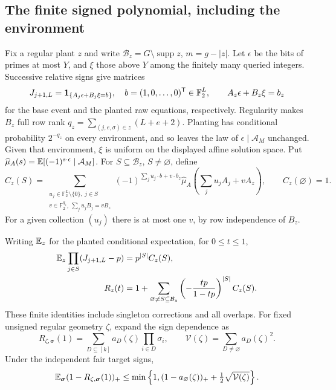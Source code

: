 \subsection{The finite signed polynomial, including the environment}\label{supp:palm:subsec:signed-void}
Fix a regular plant $z$ and write $\mathcal B_z=G\setminus\operatorname{supp}z$, $m=g-|z|$.
Let $\epsilon$ be the bits of primes at most $Y$, and $\xi$ those above $Y$ among the finitely many queried integers. Successive relative signs give matrices
\[
 J_{j+1,L}=\mathbf 1_{\{A_j\epsilon+B_j\xi=b\}},\quad
 b=(1,0,\ldots,0)^{\mathsf T}\in\mathbb F_2^L,
 \qquad A_z\epsilon+B_z\xi=b_z
\]
for the base event and the planted raw equations, respectively. Regularity makes $B_z$ full row rank
$q_z=\sum_{(j,e,\sigma)\in z}(L+e+2)$.
Planting has conditional probability $2^{-q_z}$ on every environment, and so leaves the law of $\epsilon\mid\mathcal A_M$ unchanged. Given that environment, $\xi$ is uniform on the displayed affine solution space.
Put
$\widehat\mu_A(s)=\mathbb E[(-1)^{s\cdot\epsilon}\mid\mathcal A_M]$.
For $S\subseteq\mathcal B_z$, $S\ne\varnothing$, define
\begin{equation}\label{supp:palm:eq:signed-coefficient}
 C_z(S)=
 \sum_{\substack{u_j\in\mathbb F_2^L\setminus\{0\},\ j\in S\\
                  v\in\mathbb F_2^{q_z},\ \sum_j u_jB_j=vB_z}}
 (-1)^{\sum_j u_j\cdot b+v\cdot b_z}
 \widehat\mu_A\left(\sum_j u_jA_j+vA_z\right),
 \qquad C_z(\varnothing)=1.
\end{equation}
For a given collection $(u_j)$ there is at most one $v$, by row independence of $B_z$.
\begin{proposition}\label{supp:palm:prop:signed-void}
Writing $\mathbb E_z$ for the planted conditional expectation, for $0\le t\le1$,
\begin{align}
 \mathbb E_z\prod_{j\in S}(J_{j+1,L}-p)&=p^{|S|}C_z(S),\label{supp:palm:eq:centered-plant}\\
 R_z(t)&=1+\sum_{\varnothing\ne S\subseteq\mathcal B_z}
           \left(-\frac{tp}{1-tp}\right)^{|S|}C_z(S).\label{supp:palm:eq:signed-polynomial}
\end{align}
These finite identities include singleton corrections and all overlaps. For fixed unsigned regular geometry $\zeta$, expand the sign dependence as
\[
 R_{\zeta,\boldsymbol\sigma}(1)=\sum_{D\subseteq[k]}a_D(\zeta)
                          \prod_{i\in D}\sigma_i,
 \qquad\mathcal V(\zeta)=\sum_{D\ne\varnothing}a_D(\zeta)^2.
\]
Under the independent fair target signs,
\begin{equation}\label{supp:palm:eq:walsh}
 \mathbb E_{\boldsymbol\sigma}(1-R_{\zeta,\boldsymbol\sigma}(1))_+
 \le\min\left\{1,(1-a_\varnothing(\zeta))_+
                             +\tfrac12\sqrt{\mathcal V(\zeta)}\right\}.
\end{equation}
\end{proposition}
